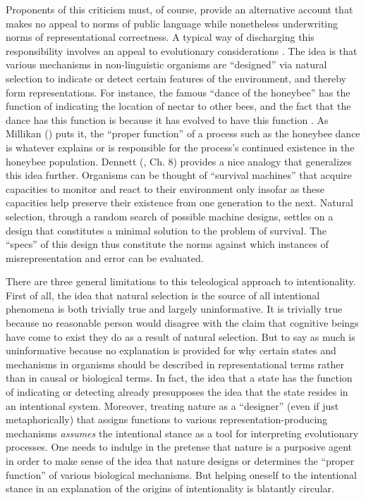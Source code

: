 Proponents of this criticism must, of course, provide an alternative account that makes no appeal to norms of public language while nonetheless underwriting norms of representational correctness. A typical way of discharging this responsibility involves an appeal to evolutionary considerations \citep{Millikan:1989,Millikan:2005,Dennett:1987,Dennett:2010}. The idea is that various mechanisms in non-linguistic organisms are ``designed'' via natural selection to indicate or detect certain features of the environment, and thereby form representations. For instance, the famous ``dance of the honeybee'' has the function of indicating the location of nectar to other bees, and the fact that the dance has this function is because it has evolved to have this function \citep[see][]{Sellars:1953}. As Millikan (\citeyear{Millikan:1989}) puts it, the ``proper function'' of a process such as the honeybee dance is whatever explains or is responsible for the process's continued existence in the honeybee population. Dennett (\citeyear{Dennett:1987}, Ch. 8) provides a nice analogy that generalizes this idea further. Organisms can be thought of ``survival machines'' that acquire capacities to monitor and react to their environment only insofar as these capacities help preserve their existence from one generation to the next. Natural selection, through a random search of possible machine designs, settles on a design that constitutes a minimal solution to the problem of survival. The ``specs'' of this design thus constitute the norms against which instances of misrepresentation and error can be evaluated. 

There are three general limitations to this teleological approach to intentionality. First of all, the idea that natural selection is the source of all intentional phenomena is both trivially true and largely uninformative. It is trivially true because no reasonable person would disagree with the claim that cognitive beings have come to exist they do as a result of natural selection. But to say as much is uninformative because no explanation is provided for why certain states and mechanisms in organisms should be described in representational terms rather than in causal or biological terms. In fact, the idea that a state has the function of indicating or detecting already presupposes the idea that the state resides in an intentional system. Moreover, treating nature as a ``designer'' (even if just metaphorically) that assigns functions to various representation-producing mechanisms \textit{assumes} the intentional stance as a tool for interpreting evolutionary processes. One needs to indulge in the pretense that nature is a purposive agent in order to make sense of the idea that nature designs or determines the ``proper function'' of various biological mechanisms. But helping oneself to the intentional stance in an explanation of the origins of intentionality is blatantly circular. 

